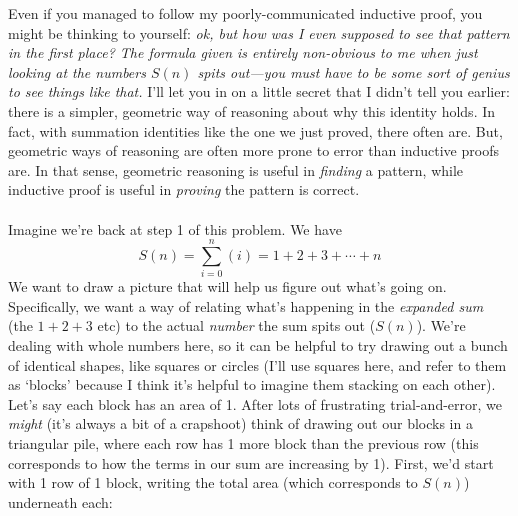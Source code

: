\documentclass[10pt]{article}
\theoremstyle{definition}
\begin{document}
Even if you managed to follow my poorly-communicated inductive proof, you might be thinking to yourself: \textit{ok, but how was I even supposed to see that pattern in the first place?  The formula given is entirely non-obvious to me when just looking at the numbers $S(n)$ spits out---you must have to be some sort of genius to see things like that.}  I'll let you in on a little secret that I didn't tell you earlier: there is a simpler, geometric way of reasoning about why this identity holds.  In fact, with summation identities like the one we just proved, there often are.  But, geometric ways of reasoning are often more prone to error than inductive proofs are.  In that sense, geometric reasoning is useful in \emph{finding} a pattern, while inductive proof is useful in \emph{proving} the pattern is correct.  \\~\\
Imagine we're back at step 1 of this problem.  We have
\[S(n) = \sum_{i=0}^n(i) = 1 + 2 + 3 + \cdots + n\]
We want to draw a picture that will help us figure out what's going on.  Specifically, we want a way of relating what's happening in the \emph{expanded sum} (the $1+2+3$ etc) to the actual \emph{number} the sum spits out ($S(n)$).  We're dealing with whole numbers here, so it can be helpful to try drawing out a bunch of identical shapes, like squares or circles (I'll use squares here, and refer to them as `blocks' because I think it's helpful to imagine them stacking on each other).  Let's say each block has an area of 1.  After lots of frustrating trial-and-error, we \emph{might} (it's always a bit of a crapshoot) think of drawing out our blocks in a triangular pile, where each row has 1 more block than the previous row (this corresponds to how the terms in our sum are increasing by 1).  First, we'd start with 1 row of 1 block, writing the total area (which corresponds to $S(n)$) underneath each:
\end{document}
